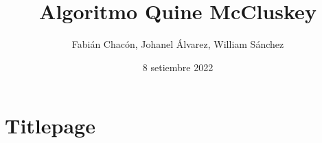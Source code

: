 \documentclass{beamer}%
\title{Algoritmo Quine McCluskey}%
\author{Fabián Chacón, Johanel Álvarez, William Sánchez}%
\date{8 setiembre 2022}%
\begin{document}
%
\normalsize%
\section{Titlepage}%
\label{sec:Titlepage}%
\maketitle

%
\end{document}
